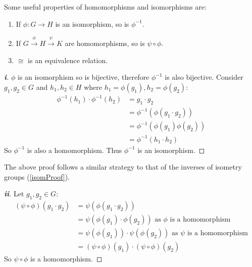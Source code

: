 \documentclass[../main.tex]{subfiles}
\begin{document}
\begin{proposition}
  Some useful properties of homomorphisms and isomorphisms are:
  \begin{enumerate}
    \item If $\phi: G \to H$ is an isomorphism, so is $\phi^{-1}$.
    \item If $G \xrightarrow{\phi} H \xrightarrow{\psi} K$ are homomorphisms, so is $\psi \circ \phi$.
    \item $\cong$ is an equivalence relation.
  \end{enumerate}
\end{proposition}
\begin{proof}[\textbf{i}]
  $\phi$ is an isomorphism so is bijective, therefore $\phi^{-1}$ is also bijective.
  Consider $g_1, g_2 \in G$ and $h_1, h_2 \in H$ where $h_1 = \phi(g_1), h_2 = \phi(g_2)$:
  \begin{align*}
    \phi^{-1}(h_1) \cdot \phi^{-1}(h_2) &= g_1 \cdot g_2 \\
                                        &= \phi^{-1}(\phi(g_1 \cdot g_2)) \\
                                        &= \phi^{-1}(\phi(g_1)\phi(g_2)) \\
                                        &= \phi^{-1}(h_1 \cdot h_2)
  \end{align*}
  So $\phi^{-1}$ is also a homomorphism.
  Thus $\phi^{-1}$ is an isomorphism.
\end{proof}
\begin{remark}
  The above proof follows a similar strategy to that of the inverses of isometry groups (\cref{isomProof}).
\end{remark}
\begin{proof}[\textbf{ii}]
  Let $g_1, g_2 \in G$:
  \begin{align*}
    (\psi \circ \phi)(g_1 \cdot g_2) &= \psi(\phi(g_1 \cdot g_2)) \\
                                     &= \psi(\phi(g_1) \cdot \phi(g_2)) \text{ as $\phi$ is a homomorphism} \\
                                     &= \psi(\phi(g_1)) \cdot \psi(\phi(g_2)) \text{ as $\psi$ is a homomorphism}\\
                                     &= (\psi \circ \phi)(g_1) \cdot (\psi \circ \phi)(g_2)
  \end{align*}
So $\psi \circ \phi$ is a homomorphism.
\end{proof}
\end{document}
